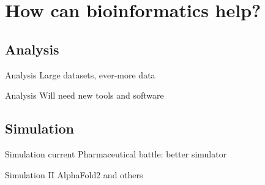 \section{How can bioinformatics help?}

\subsection{Analysis}

\begin{frame}[c]{Analysis}
    Large datasets, ever-more data
\end{frame}


\begin{frame}[c]{Analysis}
    Will need new tools and software
\end{frame}

\subsection{Simulation}

\begin{frame}[c]{Simulation}
    current Pharmaceutical battle: better simulator
\end{frame}


\begin{frame}[c]{Simulation II}
    AlphaFold2 and others
\end{frame}
